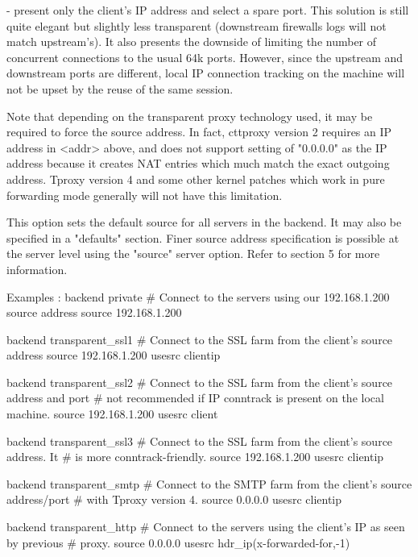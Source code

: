     - present only the client's IP address and select a spare port. This
      solution is still quite elegant but slightly less transparent (downstream
      firewalls logs will not match upstream's). It also presents the downside
      of limiting the number of concurrent connections to the usual 64k ports.
      However, since the upstream and downstream ports are different, local IP
      connection tracking on the machine will not be upset by the reuse of the
      same session.

  Note that depending on the transparent proxy technology used, it may be
  required to force the source address. In fact, cttproxy version 2 requires an
  IP address in <addr> above, and does not support setting of "0.0.0.0" as the
  IP address because it creates NAT entries which much match the exact outgoing
  address. Tproxy version 4 and some other kernel patches which work in pure
  forwarding mode generally will not have this limitation.

  This option sets the default source for all servers in the backend. It may
  also be specified in a "defaults" section. Finer source address specification
  is possible at the server level using the "source" server option. Refer to
  section 5 for more information.

  Examples :
        backend private
            # Connect to the servers using our 192.168.1.200 source address
            source 192.168.1.200

        backend transparent_ssl1
            # Connect to the SSL farm from the client's source address
            source 192.168.1.200 usesrc clientip

        backend transparent_ssl2
            # Connect to the SSL farm from the client's source address and port
            # not recommended if IP conntrack is present on the local machine.
            source 192.168.1.200 usesrc client

        backend transparent_ssl3
            # Connect to the SSL farm from the client's source address. It
            # is more conntrack-friendly.
            source 192.168.1.200 usesrc clientip

        backend transparent_smtp
            # Connect to the SMTP farm from the client's source address/port
            # with Tproxy version 4.
            source 0.0.0.0 usesrc clientip

        backend transparent_http
            # Connect to the servers using the client's IP as seen by previous
            # proxy.
            source 0.0.0.0 usesrc hdr_ip(x-forwarded-for,-1)


